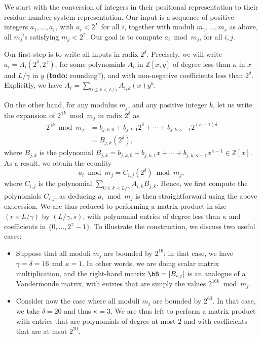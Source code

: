 \documentclass[acmtoms]{acmsmall}
\def\Z{\mathbb{Z}}
\newcommand{\todo}[1]{(\textbf{todo:} #1)}
\begin{document}
We start with the conversion of integers in their positional
representation to their residue number system representation.  Our
input is a sequence of positive integers $a_1,\dots,a_r$, with $a_i <
2^L$ for all $i$, together with moduli $m_1,\dots,m_s$ as above, all
$m_j$'s satisfying $m_j < 2^\gamma$. Our goal is to compute $a_i \bmod
m_j$, for all $i,j$.

Our first step is to write all inputs in radix $2^\delta$. Precisely,
we will write $a_i = A_i(2^\delta,2^\gamma)$, for some polynomials
$A_i$ in $\Z[x,y]$ of degree less than $\kappa$ in $x$ and $L/\gamma$
in $y$ \todo{rounding?}, and with non-negative coefficients less than
$2^\delta$. Explicitly, we have $A_i =\sum_{0 \le k < L/\gamma}
A_{i,k}(x) y^k$.

On the other hand, for any modulus $m_j$, and any positive integer
$k$, let us write the expansion of $2^{\gamma k} \bmod m_j$ 
in radix $2^\delta$ as
\begin{align*}
2^{\gamma k} \bmod m_j &=b_{j,k,0}+b_{j,k,1}2^{\delta} + \cdots +b_{j,k,\kappa-1}2^{(\kappa-1)\delta} \\  
&=B_{j,k}(2^\delta),
\end{align*}
where $B_{j,k}$ is the polynomial $B_{j,k}=b_{j,k,0}+b_{j,k,1}x +
\cdots +b_{j,k,\kappa-1}x^{\kappa-1} \in \Z[x]$.  As a result, we
obtain the equality
$$a_i \bmod m_j = C_{i,j}(2^\delta) \bmod m_j,$$ where $C_{i,j}$ is
the polynomial $\sum_{0 \le k < L/\gamma} A_{i,k} B_{j,k}$.  Hence, we
first compute the polynomials $C_{i,j}$, as deducing $a_i \bmod m_j$
is then straightforward using the above expression.  We are thus
reduced to performing a matrix product in size $(r \times L/\gamma)$
by $(L/\gamma,s)$, with polynomial entries of degree less than
$\kappa$ and coefficients in $\{0,\dots,2^\gamma-1\}$. To illustrate
the construction, we discuss two useful cases:
\begin{itemize}
\item Suppose that all moduli $m_j$ are bounded by $2^{16}$; in that 
  case, we have $\gamma=\delta=16$ and $\kappa=1$. In other words,
  we are doing scalar matrix multiplication, and the right-hand matrix
  $\bB=[B_{i,j}]$ is an analogue of a Vandermonde matrix, with 
  entries that are simply the values $2^{16 k} \bmod m_j$.
\item Consider now the case where all moduli $m_j$ are bounded by
  $2^{60}$.  In that case, we take $\delta=20$ and thus $\kappa=3$.
  We are thus left to perform a matrix product with entries that are
  polynomials of degree at most $2$ and with coefficients that are at
  msot $2^{20}$.
\end{itemize}
\end{document}
